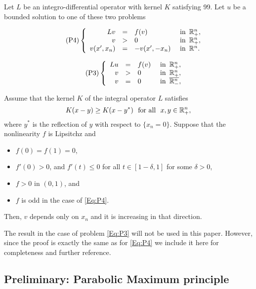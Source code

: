\begin{theorem}
	\label{Th:SymmHalfSpace}
	Let $L$ be an integro-differential operator with kernel $K$ satisfying 99. Let $u$ be a bounded solution to one of these two problems
	
	\begin{equation}
	\leqnomode
	\tag{P4}
	\label{Eq:P4}
	\beqc{\PDEsystem}
	Lv &=& f(v)   &\textrm{ in } \,\R^n_+,\\
	v &>& 0   &\textrm{ in } \,\R^n_+,\\
	v(x',x_n) &=& -v(x',-x_n)   &\textrm{ in } \,\R^n.
	\eeqc
	\end{equation}

	\begin{equation}
	\leqnomode
	\tag{P3}
	\label{Eq:P3}
	\beqc{\PDEsystem}
	Lu &=& f(v)   &\textrm{ in } \,\R^n_+,\\
	v &>& 0   &\textrm{ in } \,\R^n_+,\\
	v &=& 0   &\textrm{ in } \,\overline{\R^n_-},
	\eeqc
	\end{equation}
	

	
	\reqnomode
	
	Assume that the kernel $K$ of the integral operator $L$ satisfies
	$$
	K(x-y) \geq K(x-y^*) \,\,\,\,\text{for all } \,\, x,y\in \mathbb{R}^n_+,
	$$
	where $y^*$ is the reflection of $y$ with respect to $\{x_n = 0\}$. Suppose that the nonlinearity $f$ is Lipsitchz and
	\begin{itemize}
		\item $f(0) = f(1) = 0$,
		\item $f'(0)>0$, and $f'(t)\leq 0$ for all $t\in[1-\delta,1]$ for some $\delta>0$,
		\item $f>0$ in $(0,1)$, and
		\item $f$ is odd in the case of \eqref{Eq:P4}.
	\end{itemize}
	Then, $v$ depends only on $x_n$ and it is increasing in that direction.
\end{theorem}


The result in the case of problem \eqref{Eq:P3} will not be used in this paper. However, since the proof is exactly the same as for \eqref{Eq:P4} we include it here for completeness and further reference.

\subsection{Preliminary: Parabolic Maximum principle}





